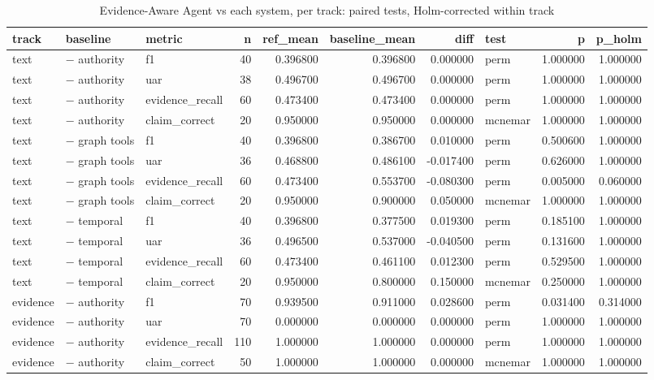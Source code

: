 \begin{table}
\caption{Evidence-Aware Agent vs each system, per track: paired tests, Holm-corrected within track}
\label{tab:table_significance}
\begin{tabular}{lllrrrrlrr}
\toprule
track & baseline & metric & n & ref\_mean & baseline\_mean & diff & test & p & p\_holm \\
\midrule
text & − authority & f1 & 40 & 0.396800 & 0.396800 & 0.000000 & perm & 1.000000 & 1.000000 \\
text & − authority & uar & 38 & 0.496700 & 0.496700 & 0.000000 & perm & 1.000000 & 1.000000 \\
text & − authority & evidence\_recall & 60 & 0.473400 & 0.473400 & 0.000000 & perm & 1.000000 & 1.000000 \\
text & − authority & claim\_correct & 20 & 0.950000 & 0.950000 & 0.000000 & mcnemar & 1.000000 & 1.000000 \\
text & − graph tools & f1 & 40 & 0.396800 & 0.386700 & 0.010000 & perm & 0.500600 & 1.000000 \\
text & − graph tools & uar & 36 & 0.468800 & 0.486100 & -0.017400 & perm & 0.626000 & 1.000000 \\
text & − graph tools & evidence\_recall & 60 & 0.473400 & 0.553700 & -0.080300 & perm & 0.005000 & 0.060000 \\
text & − graph tools & claim\_correct & 20 & 0.950000 & 0.900000 & 0.050000 & mcnemar & 1.000000 & 1.000000 \\
text & − temporal & f1 & 40 & 0.396800 & 0.377500 & 0.019300 & perm & 0.185100 & 1.000000 \\
text & − temporal & uar & 36 & 0.496500 & 0.537000 & -0.040500 & perm & 0.131600 & 1.000000 \\
text & − temporal & evidence\_recall & 60 & 0.473400 & 0.461100 & 0.012300 & perm & 0.529500 & 1.000000 \\
text & − temporal & claim\_correct & 20 & 0.950000 & 0.800000 & 0.150000 & mcnemar & 0.250000 & 1.000000 \\
evidence & − authority & f1 & 70 & 0.939500 & 0.911000 & 0.028600 & perm & 0.031400 & 0.314000 \\
evidence & − authority & uar & 70 & 0.000000 & 0.000000 & 0.000000 & perm & 1.000000 & 1.000000 \\
evidence & − authority & evidence\_recall & 110 & 1.000000 & 1.000000 & 0.000000 & perm & 1.000000 & 1.000000 \\
evidence & − authority & claim\_correct & 50 & 1.000000 & 1.000000 & 0.000000 & mcnemar & 1.000000 & 1.000000 \\

\end{tabular}
\end{table}
